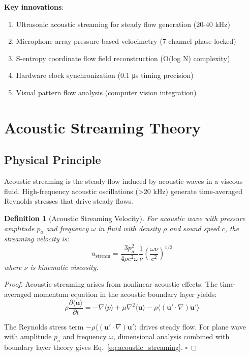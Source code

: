\documentclass[12pt,a4paper]{article}
\newtheorem{definition}{Definition}
\begin{document}
\textbf{Key innovations}:
\begin{enumerate}
\item Ultrasonic acoustic streaming for steady flow generation (20-40 kHz)
\item Microphone array pressure-based velocimetry (7-channel phase-locked)
\item S-entropy coordinate flow field reconstruction (O(log N) complexity)
\item Hardware clock synchronization (0.1 μs timing precision)
\item Visual pattern flow analysis (computer vision integration)
\end{enumerate}

\section{Acoustic Streaming Theory}

\subsection{Physical Principle}

Acoustic streaming is the steady flow induced by acoustic waves in a viscous fluid. High-frequency acoustic oscillations (>20 kHz) generate time-averaged Reynolds stresses that drive steady flows.

\begin{definition}[Acoustic Streaming Velocity]
For acoustic wave with pressure amplitude $p_a$ and frequency $\omega$ in fluid with density $\rho$ and sound speed $c$, the streaming velocity is:
\begin{equation}
u_{\text{stream}} = \frac{3p_a^2}{4\rho c^2 \omega} \frac{1}{\nu} \left(\frac{\omega \nu}{c^2}\right)^{1/2}
\label{eq:acoustic_streaming}
\end{equation}
where $\nu$ is kinematic viscosity.
\end{definition}

\begin{proof}
Acoustic streaming arises from nonlinear acoustic effects. The time-averaged momentum equation in the acoustic boundary layer yields:
\begin{equation}
\rho \frac{\partial \langle \mathbf{u} \rangle}{\partial t} = -\nabla \langle p \rangle + \mu \nabla^2 \langle \mathbf{u} \rangle - \rho \langle (\mathbf{u}' \cdot \nabla) \mathbf{u}' \rangle
\end{equation}

The Reynolds stress term $-\rho \langle (\mathbf{u}' \cdot \nabla) \mathbf{u}' \rangle$ drives steady flow. For plane wave with amplitude $p_a$ and frequency $\omega$, dimensional analysis combined with boundary layer theory gives Eq.~\eqref{eq:acoustic_streaming}. $\square$
\end{proof}
\end{document}
